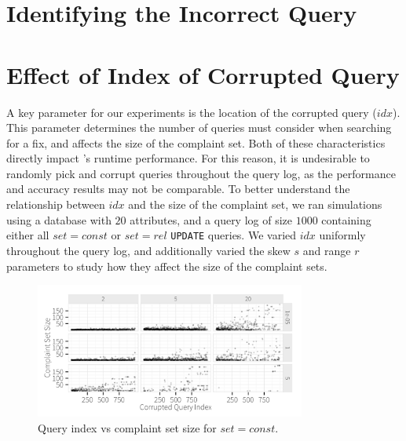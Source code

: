 \section{Identifying the Incorrect Query}
\label{app:index}

\section{Effect of Index of Corrupted Query}
\label{app:qidx}

A key parameter for our experiments is the location of the corrupted query ($idx$).  
This parameter determines the number of queries \sys must consider when searching for a fix,
and affects the size of the complaint set.  
Both of these characteristics directly impact \sys's 
runtime performance. For this reason, it is undesirable to randomly pick and corrupt queries
throughout the query log, as the performance and accuracy results may not be comparable. 
To better understand the relationship between $idx$ and the size of the complaint set, we ran
simulations using a database with $20$ attributes, and a query log of size $1000$ containing
either all $set = const$ or $set = rel$ \texttt{UPDATE} queries.
We varied  $idx$ uniformly throughout the query log, and additionally varied
the skew $s$ and range $r$ parameters to study how they affect the size of the complaint sets.


  \begin{figure}[h]
  \centering
  \includegraphics[width = 3.5in]{figures/qidxsimulation/qidx_v_ncomplaints_20attrs_const}
  \caption{Query index vs complaint set size for $set = const$.}
  \label{f:qidx_v_ncomplaints_const} 
  \end{figure}


